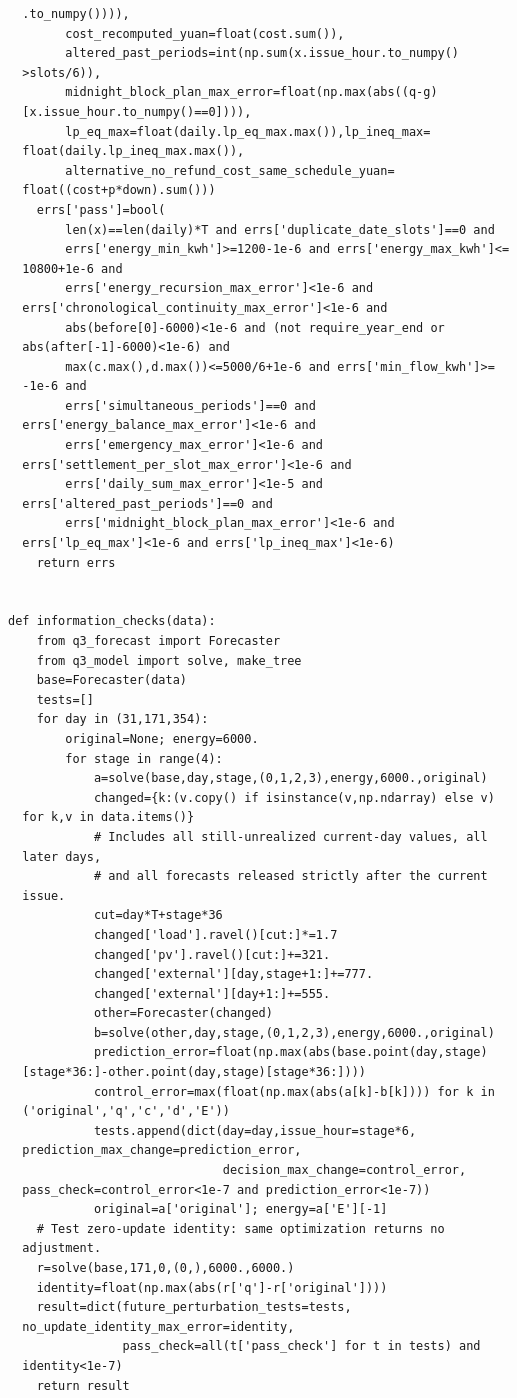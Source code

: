 \begin{verbatim}
  .to_numpy()))),
        cost_recomputed_yuan=float(cost.sum()),
        altered_past_periods=int(np.sum(x.issue_hour.to_numpy()
  >slots/6)),
        midnight_block_plan_max_error=float(np.max(abs((q-g)
  [x.issue_hour.to_numpy()==0]))),
        lp_eq_max=float(daily.lp_eq_max.max()),lp_ineq_max=
  float(daily.lp_ineq_max.max()),
        alternative_no_refund_cost_same_schedule_yuan=
  float((cost+p*down).sum()))
    errs['pass']=bool(
        len(x)==len(daily)*T and errs['duplicate_date_slots']==0 and
        errs['energy_min_kwh']>=1200-1e-6 and errs['energy_max_kwh']<=
  10800+1e-6 and
        errs['energy_recursion_max_error']<1e-6 and
  errs['chronological_continuity_max_error']<1e-6 and
        abs(before[0]-6000)<1e-6 and (not require_year_end or
  abs(after[-1]-6000)<1e-6) and
        max(c.max(),d.max())<=5000/6+1e-6 and errs['min_flow_kwh']>=
  -1e-6 and
        errs['simultaneous_periods']==0 and
  errs['energy_balance_max_error']<1e-6 and
        errs['emergency_max_error']<1e-6 and
  errs['settlement_per_slot_max_error']<1e-6 and
        errs['daily_sum_max_error']<1e-5 and
  errs['altered_past_periods']==0 and
        errs['midnight_block_plan_max_error']<1e-6 and
  errs['lp_eq_max']<1e-6 and errs['lp_ineq_max']<1e-6)
    return errs


def information_checks(data):
    from q3_forecast import Forecaster
    from q3_model import solve, make_tree
    base=Forecaster(data)
    tests=[]
    for day in (31,171,354):
        original=None; energy=6000.
        for stage in range(4):
            a=solve(base,day,stage,(0,1,2,3),energy,6000.,original)
            changed={k:(v.copy() if isinstance(v,np.ndarray) else v)
  for k,v in data.items()}
            # Includes all still-unrealized current-day values, all
  later days,
            # and all forecasts released strictly after the current
  issue.
            cut=day*T+stage*36
            changed['load'].ravel()[cut:]*=1.7
            changed['pv'].ravel()[cut:]+=321.
            changed['external'][day,stage+1:]+=777.
            changed['external'][day+1:]+=555.
            other=Forecaster(changed)
            b=solve(other,day,stage,(0,1,2,3),energy,6000.,original)
            prediction_error=float(np.max(abs(base.point(day,stage)
  [stage*36:]-other.point(day,stage)[stage*36:])))
            control_error=max(float(np.max(abs(a[k]-b[k]))) for k in
  ('original','q','c','d','E'))
            tests.append(dict(day=day,issue_hour=stage*6,
  prediction_max_change=prediction_error,
                              decision_max_change=control_error,
  pass_check=control_error<1e-7 and prediction_error<1e-7))
            original=a['original']; energy=a['E'][-1]
    # Test zero-update identity: same optimization returns no
  adjustment.
    r=solve(base,171,0,(0,),6000.,6000.)
    identity=float(np.max(abs(r['q']-r['original'])))
    result=dict(future_perturbation_tests=tests,
  no_update_identity_max_error=identity,
                pass_check=all(t['pass_check'] for t in tests) and
  identity<1e-7)
    return result



\end{verbatim}
